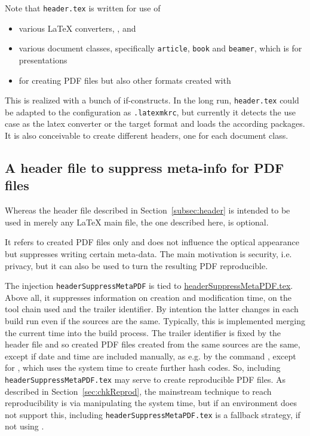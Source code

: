Note that \texttt{header.tex} is written for use of 
%
\begin{itemize}
  \item various \LaTeX{} converters, \lualatex, \xelatex{} and \pdflatex{} 
  \item various document classes, specifically \texttt{article}, \texttt{book} 
  and \texttt{beamer}, which is for presentations 
  \item for creating PDF files but also other formats created with  
\end{itemize}

This is realized with a bunch of if-constructs. 
In the long run, \texttt{header.tex} could be adapted 
to the configuration as \texttt{.latexmkrc}, 
but currently it detects the use case 
as the latex converter or the target format 
and loads the according packages. 
It is also conceivable to create different headers, one for each document class. 


\subsection{A header file to suppress meta-info for PDF files }\label{subsec:headerSuppressMetaPDF}

Whereas the header file described in Section~\ref{subsec:header} is intended to be used 
in merely any \LaTeX{} main file, 
the one described here, is optional. 

It refers to created PDF files only and does not influence the optical appearance 
but suppresses writing certain meta-data. 
The main motivation is security, i.e. privacy, 
but it can also be used to turn the resulting PDF reproducible. 


The injection \texttt{headerSuppressMetaPDF} 
is tied to \href{\urlSite fromTex/headerSuppressMetaPDF.tex}{headerSuppressMetaPDF.tex}. 
Above all, it suppresses information on creation and modification time, on the tool chain used 
and the trailer identifier. 
By intention the latter changes in each build run even if the sources are the same. 
Typically, this is implemented merging the current time into the build process. 
The trailer identifier is fixed by the header file 
and so created PDF files created from the same sources are the same, 
except if date and time are included manually, as e.g. by the command , 
except for \xelatex, which uses the system time to create further hash codes. 
So, including \texttt{headerSuppressMetaPDF.tex} may serve to create reproducible PDF files. 
As described in Section~\ref{sec:chkReprod}, 
the mainstream technique to reach reproducibility 
is via manipulating the system time, 
but if an environment does not support this, 
including \texttt{headerSuppressMetaPDF.tex} is a fallback strategy, 
if not using \xelatex. 

